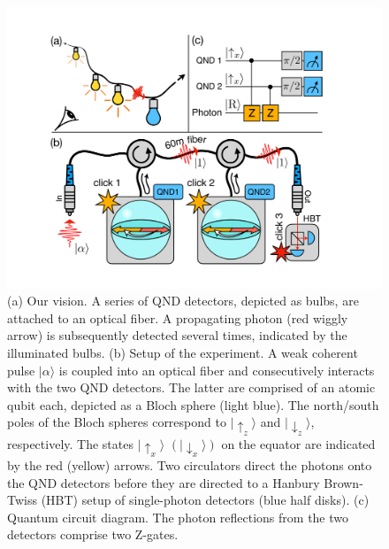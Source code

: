 \documentclass[prl,twocolumn,amsmath,amssymb,bibnotes,aps,longbibliography]{revtex4-1}
\newcommand{\ket}[1]{|{#1}\rangle}
\begin{document}
\begin{figure}[b]
\centering
\includegraphics[width=\columnwidth]{Fig1.pdf}
\caption{\label{fig:setup} (a) Our vision. A series of QND detectors, depicted as bulbs, are attached to an optical fiber. A propagating photon (red wiggly arrow) is subsequently detected several times, indicated by the illuminated bulbs. (b) Setup of the experiment. A weak coherent pulse $\ket{\alpha}$ is coupled into an optical fiber and consecutively interacts with the two QND detectors. The latter are comprised of an atomic qubit each, depicted as a Bloch sphere (light blue). The north/south poles of the Bloch spheres correspond to $\ket{\uparrow_z}$ and $\ket{\downarrow_z}$, respectively. The states $\ket{\uparrow_x}$ $(\ket{\downarrow_x})$ on the equator are indicated by the red (yellow) arrows. Two circulators direct the photons onto the QND detectors before they are directed to a Hanbury Brown-Twiss (HBT) setup of single-photon detectors (blue half disks). (c) Quantum circuit diagram. The photon reflections from the two detectors comprise two Z-gates.}
\end{figure}
\end{document}

